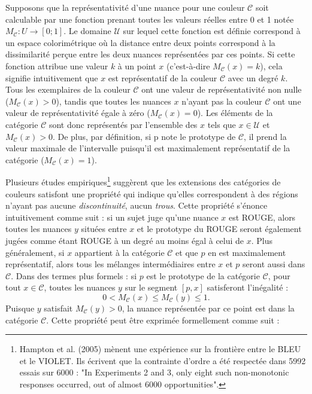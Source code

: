 \documentclass{article}
\begin{document}
Supposons que la représentativité d’une nuance pour une couleur $\mathcal{C}$ soit calculable par une fonction prenant toutes les valeurs réelles entre 0 et 1 notée $M_\mathcal{C}: U \rightarrow [0;1]$. Le domaine $\mathcal{U}$ sur lequel cette fonction est définie correspond à un espace colorimétrique où la distance entre deux points correspond à la dissimilarité perçue entre les deux nuances représentées par ces points. Si cette fonction attribue une valeur $k$ à un point $x$ (c’est-à-dire $M_\mathcal{C}(x)=k$), cela signifie intuitivement que $x$ est représentatif de la couleur $\mathcal{C}$ avec un degré $k$. Tous les exemplaires de la couleur $\mathcal{C}$ ont une valeur de représentativité non nulle ($M_\mathcal{C}(x)>0$), tandis que toutes les nuances $x$ n’ayant pas la couleur $\mathcal{C}$ ont une valeur de représentativité égale à zéro ($M_\mathcal{C}(x)=0$). Les éléments de la catégorie $\mathcal{C}$ sont donc représentés par l’ensemble des $x$ tels que $x\in\mathcal{U}$ et $M_\mathcal{C}(x)>0$. De plus, par définition, si p note le prototype de $\mathcal{C}$, il prend la valeur maximale de l'intervalle puisqu'il est maximalement représentatif de la catégorie ($M_\mathcal{C}(x)=1$).
\par
Plusieurs études empiriques\footnote{Hampton et al. (2005) mènent une expérience sur la frontière entre le BLEU et le VIOLET. Ils écrivent que la contrainte d'ordre a été respectée dans 5992 essais sur 6000 : "In Experiments 2 and 3, only eight such non-monotonic responses occurred, out of almost 6000 opportunities".} suggèrent que les extensions des catégories de couleurs satisfont une propriété qui indique qu’elles correspondent à des régions n’ayant pas aucune \textit{discontinuité}, aucun \textit{trous}. Cette propriété s’énonce intuitivement comme suit : si un sujet juge qu’une nuance $x$ est ROUGE, alors toutes les nuances $y$ situées entre $x$ et le prototype du ROUGE seront également jugées comme étant ROUGE à un degré au moins égal à celui de $x$. Plus généralement, si $x$ appartient à la catégorie $\mathcal{C}$ et que $p$ en est maximalement représentatif, alors tous les mélanges intermédiaires entre $x$ et $p$ seront aussi dans $\mathcal{C}$. Dans des termes plus formels : si \( p \) est le prototype de la catégorie \( \mathcal{C} \), pour tout \( x \in \mathcal{C} \), toutes les nuances \( y \) sur le segment \([p,x]\) satisferont l’inégalité : 
\[
0 < M_{\mathcal{C}}(x) \leq M_{\mathcal{C}}(y) \leq 1.
\] 
Puisque \( y \) satisfait \( M_{\mathcal{C}}(y) > 0 \), la nuance représentée par ce point est dans la catégorie \( \mathcal{C} \). Cette propriété peut être exprimée formellement comme suit :
\end{document}
